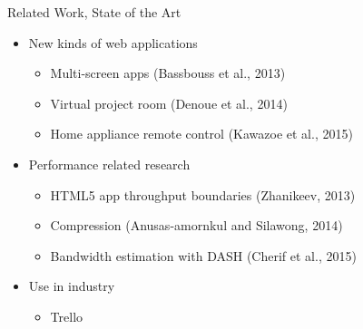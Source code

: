 \documentclass[first=dgreen,second=purple,logo=blueque,finnish]{aaltoslides}
\begin{document}
\begin{frame}{Related Work, State of the Art}

\begin{itemize}
\item New kinds of web applications
\begin{itemize}
\item Multi-screen apps (Bassbouss et al., 2013)
\item Virtual project room (Denoue et al., 2014)
\item Home appliance remote control (Kawazoe et al., 2015)
\end{itemize}
\item Performance related research
\begin{itemize}
\item HTML5 app throughput boundaries (Zhanikeev, 2013)
\item Compression (Anusas-amornkul and Silawong, 2014)
\item Bandwidth estimation with DASH (Cherif et al., 2015)
\end{itemize}
\item Use in industry
\begin{itemize}
\item Trello
\end{itemize}
\end{itemize}

\end{frame}

\end{document}
